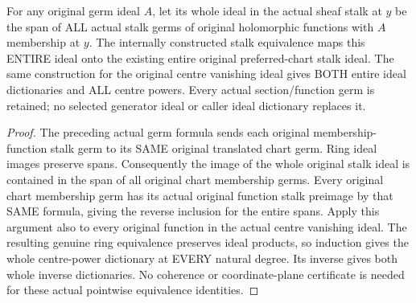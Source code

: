 \begin{lemma}
\label{hir:real-domain-actual-complex-sheaf-stalk-whole-original-ideals}
\leanok
For any original germ ideal $A$, let its whole ideal in the actual sheaf
stalk at $y$ be the span of ALL actual stalk germs of original holomorphic
functions with $A$ membership at $y$. The internally constructed stalk
equivalence maps this ENTIRE ideal onto the existing entire original
preferred-chart stalk ideal. The same construction for the original centre
vanishing ideal gives BOTH entire ideal dictionaries and ALL centre powers.
Every actual section/function germ is retained; no selected generator ideal
or caller ideal dictionary replaces it.
\end{lemma}
\begin{proof}
The preceding actual germ formula sends each original membership-function
stalk germ to its SAME original translated chart germ. Ring ideal images
preserve spans. Consequently the image of the whole original stalk ideal
is contained in the span of all original chart membership germs. Every
original chart membership germ has its actual original function stalk
preimage by that SAME formula, giving the reverse inclusion for the entire
spans. Apply this argument also to every original function in the actual
centre vanishing ideal. The resulting genuine ring equivalence preserves
ideal products, so induction gives the whole centre-power dictionary at
EVERY natural degree. Its inverse gives both whole inverse dictionaries.
No coherence or coordinate-plane certificate is needed for these actual
pointwise equivalence identities.
\end{proof}

